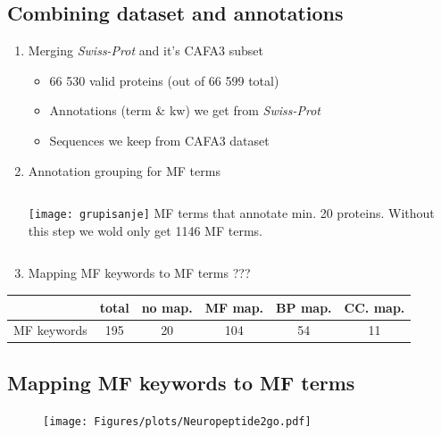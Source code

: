 \documentclass{beamer}
\newcommand{\swissprot}{\textit{Swiss-Prot} }
\begin{document}
\subsection{Combining dataset and annotations}
\begin{frame}

  \begin{enumerate}
    \item Merging \swissprot and it's CAFA3 subset
      \pause
      \begin{itemize}
        \item 66 530 valid proteins (out of 66 599 total)
        \item Annotations (term \& kw) we get from \swissprot
        \item Sequences we keep from CAFA3 dataset
      \end{itemize}
      \pause
    \item Annotation grouping for MF terms
  \begin{columns}
    \texttt{[image: grupisanje]}
     MF terms that annotate min. 20 proteins.
    Without this step we wold only get 1146 MF terms.
  \end{columns}
      \pause
    \item
      Mapping MF keywords to MF terms ???
      \pause


  \end{enumerate}

  \begin{table}
    \begin{tabular}{|r|c|c|c|c|c|}
      \hline
      & total & no map. & MF map. & BP map. & CC. map.     \\
      \hline
      MF keywords  & 195    &  20       &  104     & 54      & 11           \\
      \hline
    \end{tabular}
  \end{table}
  
\end{frame}


\subsection{Mapping MF keywords to MF terms}


%
\begin{frame}
  \begin{figure}[!th]
    \centering
    \vspace*{-0.49cm} 
    \texttt{[image: Figures/plots/Neuropeptide2go.pdf]}
  \end{figure}
\end{frame}
\end{document}
